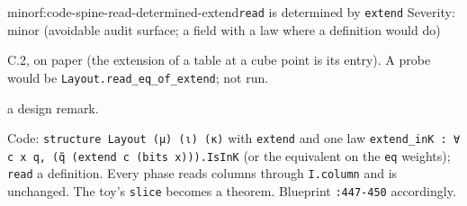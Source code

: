 \begin{finding}{minor}{f:code-spine-read-determined-extend}{\texttt{read} is determined by \texttt{extend}}
Severity: minor (avoidable audit surface; a field with a law where a definition would do)

C.2, on paper (the extension of a table at a cube point is its entry). A probe would be \texttt{Layout.\allowbreak{}read\_\allowbreak{}eq\_\allowbreak{}of\_\allowbreak{}extend}; not run.

a design remark.

Code: \texttt{structure Layout (\allowbreak{}μ) (\allowbreak{}ι) (\allowbreak{}κ)} with \texttt{extend} and one law \texttt{e\allowbreak{}x\allowbreak{}t\allowbreak{}e\allowbreak{}n\allowbreak{}d\allowbreak{}\_\allowbreak{}i\allowbreak{}n\allowbreak{}K\allowbreak{} :\allowbreak{} ∀\allowbreak{} c\allowbreak{} x\allowbreak{} q\allowbreak{},\allowbreak{} (\allowbreak{}q̃\allowbreak{} (\allowbreak{}e\allowbreak{}x\allowbreak{}t\allowbreak{}e\allowbreak{}n\allowbreak{}d\allowbreak{} c\allowbreak{} (\allowbreak{}b\allowbreak{}i\allowbreak{}t\allowbreak{}s\allowbreak{} x\allowbreak{})\allowbreak{})\allowbreak{})\allowbreak{}.\allowbreak{}I\allowbreak{}s\allowbreak{}I\allowbreak{}n\allowbreak{}K} (or the equivalent on the \texttt{eq} weights); \texttt{read} a definition. Every phase reads columns through \texttt{I.\allowbreak{}column} and is unchanged. The toy's \texttt{slice} becomes a theorem. Blueprint \texttt{:447-{}450} accordingly.

\end{finding}

